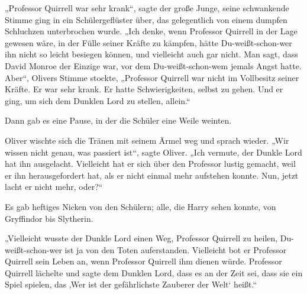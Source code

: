 „Professor Quirrell war sehr krank“, sagte der große Junge, seine schwankende Stimme ging in ein Schülergeflüster über, das gelegentlich von einem dumpfen Schluchzen unterbrochen wurde.
„Ich denke, wenn Professor Quirrell in der Lage gewesen wäre, in der Fülle seiner Kräfte zu kämpfen, hätte Du-weißt-schon-wer ihn nicht so leicht besiegen können, und vielleicht auch gar nicht. Man sagt, dass David Monroe der Einzige war, vor dem Du-weißt-schon-wem jemals Angst hatte. Aber“, Olivers Stimme stockte, „Professor Quirrell war nicht im Vollbesitz seiner Kräfte. Er war sehr krank. Er hatte Schwierigkeiten, selbst zu gehen. Und er ging, um sich dem Dunklen Lord zu stellen, allein.“

Dann gab es eine Pause, in der die Schüler eine Weile weinten.

Oliver wischte sich die Tränen mit seinem Ärmel weg und sprach wieder.
„Wir wissen nicht genau, was passiert ist“, sagte Oliver. „Ich vermute, der Dunkle Lord hat ihn ausgelacht. Vielleicht hat er sich über den Professor lustig gemacht, weil er ihn herausgefordert hat, als er nicht einmal mehr aufstehen konnte. Nun, jetzt lacht er nicht mehr, oder?“

Es gab heftiges Nicken von den Schülern; alle, die Harry sehen konnte, von Gryffindor bis Slytherin.

„Vielleicht wusste der Dunkle Lord einen Weg, Professor Quirrell zu heilen, Du-weißt-schon-wer ist ja von den Toten auferstanden. Vielleicht bot er Professor Quirrell sein Leben an, wenn Professor Quirrell ihm dienen würde. Professor Quirrell lächelte und sagte dem Dunklen Lord, dass es an der Zeit sei, dass sie ein Spiel spielen, das ‚Wer ist der gefährlichste Zauberer der Welt‘ heißt.“

